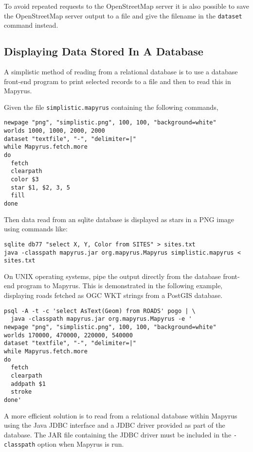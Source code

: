 

To avoid repeated requests to the OpenStreetMap server it is also
possible to save the OpenStreetMap server output to a file and give
the filename in the \texttt{dataset} command instead.

\subsection{Displaying Data Stored In A Database}

A simplistic method of reading from a relational database is to use a database
front-end program to print selected records to a file and then to read this in
Mapyrus.

Given the file \texttt{simplistic.mapyrus} containing the following
commands,

\begin{verbatim}
newpage "png", "simplistic.png", 100, 100, "background=white"
worlds 1000, 1000, 2000, 2000
dataset "textfile", "-", "delimiter=|"
while Mapyrus.fetch.more
do
  fetch
  clearpath
  color $3
  star $1, $2, 3, 5
  fill
done
\end{verbatim}

Then data read from an sqlite database is displayed as stars in a
PNG image using commands like:

\begin{verbatim}
sqlite db77 "select X, Y, Color from SITES" > sites.txt
java -classpath mapyrus.jar org.mapyrus.Mapyrus simplistic.mapyrus < sites.txt
\end{verbatim}

On UNIX operating systems, pipe the output directly from the database
front-end program to Mapyrus.  This is demonstrated in the following
example, displaying roads fetched as OGC WKT strings from a PostGIS database.

\begin{verbatim}
psql -A -t -c 'select AsText(Geom) from ROADS' pogo | \
  java -classpath mapyrus.jar org.mapyrus.Mapyrus -e '
newpage "png", "simplistic.png", 100, 100, "background=white"
worlds 170000, 470000, 220000, 540000
dataset "textfile", "-", "delimiter=|"
while Mapyrus.fetch.more
do
  fetch
  clearpath
  addpath $1
  stroke
done'
\end{verbatim}

A more efficient solution is to read from a relational database within Mapyrus
using the Java JDBC interface and a JDBC driver provided
as part of the database.  The JAR file containing the
JDBC driver must be included in the \texttt{-classpath} option
when Mapyrus is run.

